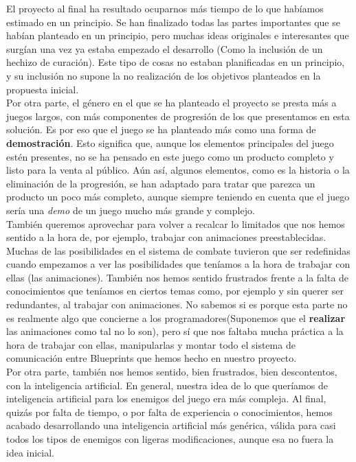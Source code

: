 El proyecto al final ha resultado ocuparnos más tiempo de lo que habíamos estimado en un principio. Se han finalizado todas las partes importantes que se habían planteado en un principio, pero muchas ideas originales e interesantes que surgían una vez ya estaba empezado el desarrollo (Como la inclusión de un hechizo de curación). Este tipo de cosas no estaban planificadas en un principio, y su inclusión no supone la no realización de los objetivos planteados en la propuesta inicial.
\\

Por otra parte, el género en el que se ha planteado el proyecto se presta más a juegos largos, con más componentes de progresión de los que presentamos en esta solución. Es por eso que el juego se ha planteado más como una forma de \textbf{demostración}. Esto significa que, aunque los elementos principales del juego estén presentes, no se ha pensado en este juego como un producto completo y listo para la venta al público. Aún así, algunos elementos, como es la historia o la eliminación de la progresión, se han adaptado para tratar que parezca un producto un poco más completo, aunque siempre teniendo en cuenta que el juego sería una \textit{demo} de un juego mucho más grande y complejo.
\\

También queremos aprovechar para volver a recalcar lo limitados que nos hemos sentido a la hora de, por ejemplo, trabajar con animaciones preestablecidas. Muchas de las posibilidades en el sistema de combate tuvieron que ser redefinidas cuando empezamos a ver las posibilidades que teníamos a la hora de trabajar con ellas (las animaciones). También nos hemos sentido frustrados frente a la falta de conocimientos que teníamos en ciertos temas como, por ejemplo y sin querer ser redundantes, al trabajar con animaciones. No sabemos si es porque esta parte no es realmente algo que concierne a los programadores(Suponemos que el \textbf{realizar} las animaciones como tal no lo son), pero sí que nos faltaba mucha práctica a la hora de trabajar con ellas, manipularlas y montar todo el sistema de comunicación entre Blueprints que hemos hecho en nuestro proyecto.
\\

Por otra parte, también nos hemos sentido, bien frustrados, bien descontentos, con la inteligencia artificial. En general, nuestra idea de lo que queríamos de inteligencia artificial para los enemigos del juego era más compleja. Al final, quizás por falta de tiempo, o por falta de experiencia o conocimientos, hemos acabado desarrollando una inteligencia artificial más genérica, válida para casi todos los tipos de enemigos con ligeras modificaciones, aunque esa no fuera la idea inicial.
\\

